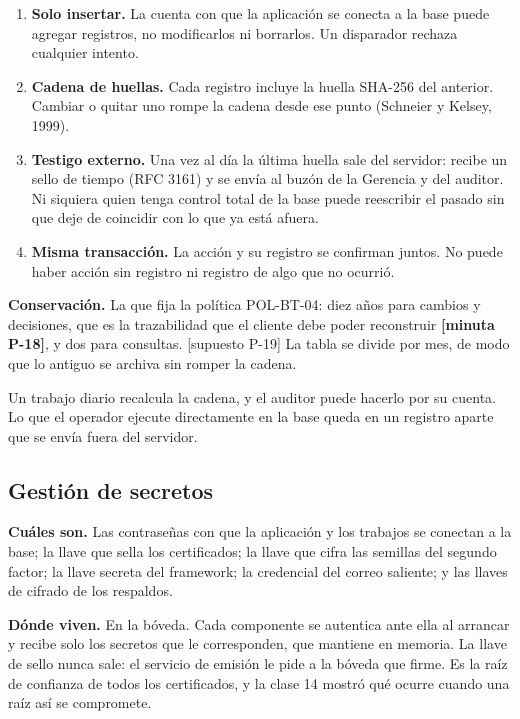 \documentclass[11pt,letterpaper]{article}
\newcommand{\resp}[1]{\textrm{\footnotesize\bfseries [minuta #1]}}
\newcommand{\supu}[1]{\textrm{\footnotesize [supuesto #1]}}
\begin{document}
\begin{enumerate}
\item \textbf{Solo insertar.} La cuenta con que la aplicación se conecta a la base puede agregar
      registros, no modificarlos ni borrarlos. Un disparador rechaza cualquier intento.
\item \textbf{Cadena de huellas.} Cada registro incluye la huella SHA-256 del anterior. Cambiar o quitar
      uno rompe la cadena desde ese punto (Schneier y Kelsey, 1999).
\item \textbf{Testigo externo.} Una vez al día la última huella sale del servidor: recibe un sello de
      tiempo (RFC 3161) y se envía al buzón de la Gerencia y del auditor. Ni siquiera quien tenga control
      total de la base puede reescribir el pasado sin que deje de coincidir con lo que ya está afuera.
\item \textbf{Misma transacción.} La acción y su registro se confirman juntos. No puede haber acción sin
      registro ni registro de algo que no ocurrió.
\end{enumerate}

\textbf{Conservación.} La que fija la política POL-BT-04: diez años para cambios y decisiones, que es la trazabilidad que el cliente debe poder reconstruir \resp{P-18}, y dos para consultas. \supu{P-19} La tabla se divide por mes, de modo que lo antiguo se archiva sin romper la cadena.

Un trabajo diario recalcula la cadena, y el auditor puede hacerlo por su cuenta. Lo que el operador
ejecute directamente en la base queda en un registro aparte que se envía fuera del servidor.

\subsection{Gestión de secretos}

\textbf{Cuáles son.} Las contraseñas con que la aplicación y los trabajos se conectan a la base; la llave
que sella los certificados; la llave que cifra las semillas del segundo factor; la llave secreta del
framework; la credencial del correo saliente; y las llaves de cifrado de los respaldos.

\textbf{Dónde viven.} En la bóveda. Cada componente se autentica ante ella al arrancar y recibe solo los
secretos que le corresponden, que mantiene en memoria. La llave de sello nunca sale: el servicio de
emisión le pide a la bóveda que firme. Es la raíz de confianza de todos los certificados, y la clase 14
mostró qué ocurre cuando una raíz así se compromete.
\end{document}
